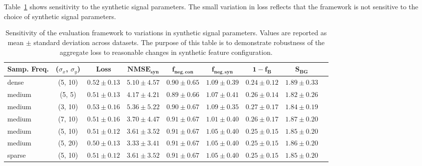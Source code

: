 \documentclass[journal,article,submit,moreauthors]{Definitions/mdpi}
\begin{document}
\appendixstart
\appendix
\section[\appendixname~\thesection]{}

Table~\ref{tab:synthetic_variations} shows sensitivity to the synthetic signal parameters. The small variation in loss reflects that the framework is not sensitive to the choice of synthetic signal parameters.

\begin{table}[h]
\centering
\footnotesize
\begin{tabular}{lcccccccr}
\hline
\textbf{Samp. Freq.} & \textbf{($\sigma_x$, $\sigma_y$)} & \textbf{Loss} & $\mathbf{NMSE}_{\mathbf{syn}}$ & $\mathbf{f}_{\mathbf{neg,con}}$ & $\mathbf{f}_{\mathbf{neg,syn}}$ & $\mathbf{1-f_B}$ & $\mathbf{S}_{\mathbf{BG}}$ \\
\hline
dense & (5, 10) & $0.52 \pm 0.13$ & $5.10 \pm 4.57$ & $0.90 \pm 0.65$ & $1.09 \pm 0.39$ & $0.24 \pm 0.12$ & $1.89 \pm 0.33$ \\
medium & (5, 5) & $0.51 \pm 0.13$ & $4.17 \pm 4.21$ & $0.89 \pm 0.66$ & $1.07 \pm 0.41$ & $0.26 \pm 0.14$ & $1.82 \pm 0.26$ \\
medium & (3, 10) & $0.53 \pm 0.16$ & $5.36 \pm 5.22$ & $0.90 \pm 0.67$ & $1.09 \pm 0.35$ & $0.27 \pm 0.17$ & $1.84 \pm 0.19$ \\
medium & (7, 10) & $0.51 \pm 0.16$ & $3.70 \pm 4.47$ & $0.91 \pm 0.67$ & $1.01 \pm 0.40$ & $0.26 \pm 0.17$ & $1.87 \pm 0.20$ \\
medium & (5, 10) & $0.51 \pm 0.12$ & $3.61 \pm 3.52$ & $0.91 \pm 0.67$ & $1.05 \pm 0.40$ & $0.25 \pm 0.15$ & $1.85 \pm 0.20$ \\
medium & (5, 20) & $0.50 \pm 0.13$ & $3.33 \pm 3.41$ & $0.91 \pm 0.67$ & $1.05 \pm 0.40$ & $0.25 \pm 0.15$ & $1.86 \pm 0.20$ \\
sparse & (5, 10) & $0.51 \pm 0.12$ & $3.61 \pm 3.52$ & $0.91 \pm 0.67$ & $1.05 \pm 0.40$ & $0.25 \pm 0.15$ & $1.85 \pm 0.20$ \\
\hline
\end{tabular}
\caption{Sensitivity of the evaluation framework to variations in synthetic signal parameters. Values are reported as mean $\pm$ standard deviation across datasets. The purpose of this table is to demonstrate robustness of the aggregate loss to reasonable changes in synthetic feature configuration.}
\label{tab:synthetic_variations}
\end{table}
\end{document}
